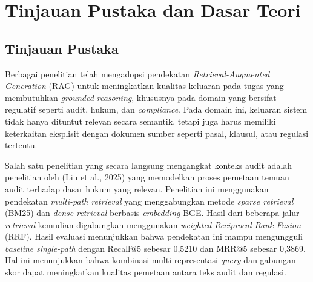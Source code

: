 


\chapter{Tinjauan Pustaka dan Dasar Teori}

\section{Tinjauan Pustaka}

Berbagai penelitian telah mengadopsi pendekatan \textit{Retrieval-Augmented Generation} (RAG) untuk meningkatkan kualitas keluaran pada tugas yang membutuhkan \textit{grounded reasoning}, khususnya pada domain yang bersifat regulatif seperti audit, hukum, dan \textit{compliance}. Pada domain ini, keluaran sistem tidak hanya dituntut relevan secara semantik, tetapi juga harus memiliki keterkaitan eksplisit dengan dokumen sumber seperti pasal, klausul, atau regulasi tertentu.

Salah satu penelitian yang secara langsung mengangkat konteks audit adalah penelitian oleh (Liu et al., 2025) yang memodelkan proses pemetaan temuan audit terhadap dasar hukum yang relevan. Penelitian ini menggunakan pendekatan \textit{multi-path retrieval} yang menggabungkan metode \textit{sparse retrieval} (BM25) dan \textit{dense retrieval} berbasis \textit{embedding} BGE. Hasil dari beberapa jalur \textit{retrieval} kemudian digabungkan menggunakan \textit{weighted Reciprocal Rank Fusion} (RRF). Hasil evaluasi menunjukkan bahwa pendekatan ini mampu mengungguli \textit{baseline} \textit{single-path} dengan Recall@5 sebesar 0,5210 dan MRR@5 sebesar 0,3869. Hal ini menunjukkan bahwa kombinasi multi-representasi \textit{query} dan gabungan skor dapat meningkatkan kualitas pemetaan antara teks audit dan regulasi.

